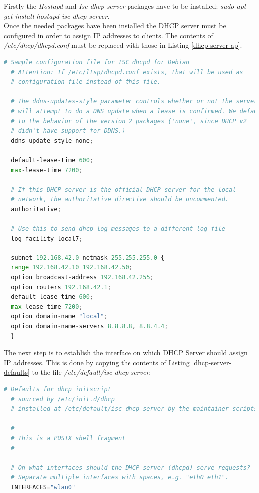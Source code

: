 Firstly the  \textit{Hostapd} and  \textit{Isc-dhcp-server} packages have to be installed: \textit{sudo apt-get install hostapd isc-dhcp-server}.\\

Once the needed packages have been installed the DHCP server must be configured in order to assign IP addresses to clients. The contents of \textit{/etc/dhcp/dhcpd.conf} must be replaced with those in Listing \ref{dhcp-server-ap}. \\

	\begin{minipage}{\linewidth}%
	\begin{lstlisting}[label=dhcp-server-ap,caption=DHCP Server Configuration {[} /etc/dhcp/dhcpd.conf {]} ,language=python ]
  # Sample configuration file for ISC dhcpd for Debian
  # Attention: If /etc/ltsp/dhcpd.conf exists, that will be used as
  # configuration file instead of this file.

  # The ddns-updates-style parameter controls whether or not the server
  # will attempt to do a DNS update when a lease is confirmed. We default 
  # to the behavior of the version 2 packages ('none', since DHCP v2 
  # didn't have support for DDNS.)
  ddns-update-style none;

  default-lease-time 600;
  max-lease-time 7200;

  # If this DHCP server is the official DHCP server for the local
  # network, the authoritative directive should be uncommented.
  authoritative;

  # Use this to send dhcp log messages to a different log file 
  log-facility local7;

  subnet 192.168.42.0 netmask 255.255.255.0 {
  range 192.168.42.10 192.168.42.50;
  option broadcast-address 192.168.42.255;
  option routers 192.168.42.1;
  default-lease-time 600;
  max-lease-time 7200;
  option domain-name "local";
  option domain-name-servers 8.8.8.8, 8.8.4.4;
  }
	\end{lstlisting}
	\end{minipage}

\bigskip
The next step is to establish the interface on which DHCP Server should assign IP addresses. This is done by copying the contents of Listing \ref{dhcp-server-defaults} to the file \textit{/etc/default/isc-dhcp-server}.\\

	\begin{minipage}{\linewidth}%
	\begin{lstlisting}[label=dhcp-server-defaults,caption=DHCP Server Defaults {[} /etc/default/isc-dhcp-server {]} ,language=python ]
  # Defaults for dhcp initscript
  # sourced by /etc/init.d/dhcp
  # installed at /etc/default/isc-dhcp-server by the maintainer scripts

  #
  # This is a POSIX shell fragment
  #

  # On what interfaces should the DHCP server (dhcpd) serve requests?
  # Separate multiple interfaces with spaces, e.g. "eth0 eth1".
  INTERFACES="wlan0"
	\end{lstlisting}
	\end{minipage}

